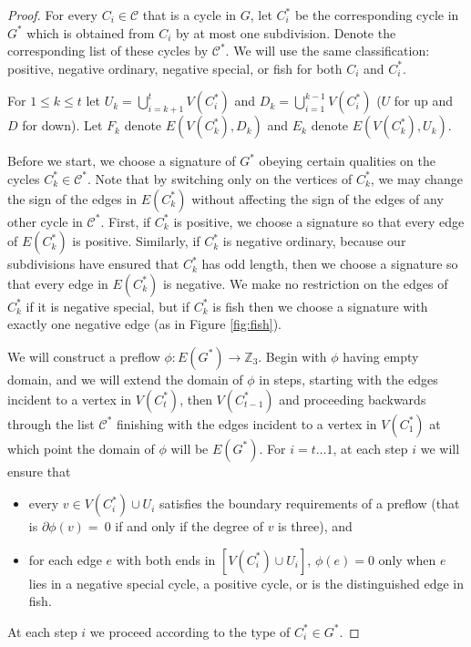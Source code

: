 \documentclass[12pt]{article}
\newcommand{\Z}{\mathbb{Z}}
\begin{document}
\begin{proof}
    For every $C_i \in \mathcal{C}$ that is a cycle in $G$, let $C_i^*$ be the corresponding cycle in $G^*$ which is obtained from $C_i$ by at most one subdivision. Denote the corresponding list of these cycles by $\mathcal{C}^*$. We will use the same classification: positive, negative ordinary, negative special, or fish for both $C_i$ and $C_i^*$. 

    For $1 \le k \le t$ let $U_k =  \bigcup_{i=k+1}^t V(C_i^*)$ and $D_k = \bigcup_{i=1}^{k-1}V(C_i^*)$ ($U$ for up and $D$ for down). Let $F_k$ denote $E(V(C_k^*), D_k)$ and $E_k$ denote $E(V(C_k^*), U_k)$.

    Before we start, we choose a signature of $G^*$ obeying certain qualities on the cycles $C_k^* \in \mathcal{C^*}$. Note that by switching only on the vertices of $C_k^*$, we may change the sign of the edges in $E(C_k^*)$ without affecting the sign of the edges of any other cycle in $\mathcal{C^*}$. First, if $C_k^*$ is positive, we choose a signature so that every edge of $E(C_k^*)$ is positive. Similarly, if $C_k^*$ is negative ordinary, because our subdivisions have ensured that $C_k^*$ has odd length, then we choose a signature so that every edge in $E(C_k^*)$ is negative. We make no restriction on the edges of $C_k^*$ if it is negative special, but if $C_k^*$ is fish then we choose a signature with exactly one negative edge (as in Figure \ref{fig:fish}).

    We will construct a preflow $\phi: E(G^*) \to \Z_3$. Begin with $\phi$ having empty domain, and we will extend the domain of $\phi$ in steps, starting with the edges incident to a vertex in $V(C_t^*)$, then $V(C_{t-1}^*)$ and proceeding backwards through the list $\mathcal{C^*}$ finishing with the edges incident to a vertex in $V(C_1^*)$ at which point the domain of $\phi$ will be $E(G^*)$. For $i = t \dots 1$, at each step $i$ we will ensure that 
    \begin{itemize}
        \item every $v \in V(C_i^*) \cup U_i$ satisfies the boundary requirements of a preflow (that is $\partial\phi(v) =~0$ if and only if the degree of $v$ is three), and
        \item for each edge $e$ with both ends in $[V(C_i^*) \cup U_i]$, $\phi(e) = 0$ only when $e$ lies in a negative special cycle, a positive cycle, or is the distinguished edge in fish.
    \end{itemize}
    At each step $i$ we proceed according to the type of $C_i^* \in G^*$.


\end{proof}
\end{document}
